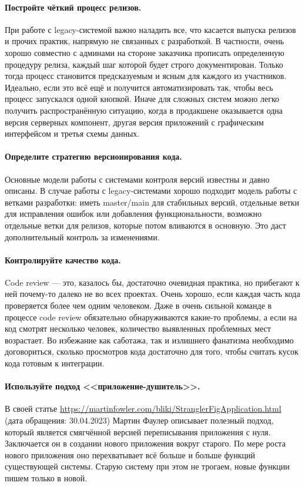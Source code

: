 \documentclass{../../text-style}
\begin{document}
\paragraph{Постройте чёткий процесс релизов.} При работе с legacy-системой важно наладить все, что касается выпуска релизов и прочих практик, напрямую не связанных с разработкой. В частности, очень хорошо совместно с админами на стороне заказчика прописать определенную процедуру релиза, каждый шаг которой будет строго документирован. Только тогда процесс становится предсказуемым и ясным для каждого из участников. Идеально, если это всё ещё и получится автоматизировать так, чтобы весь процесс запускался одной кнопкой. Иначе для сложных систем можно легко получить распространённую ситуацию, когда в продакшене оказывается одна версия серверных компонент, другая версия приложений с графическим интерфейсом и третья схемы данных.

\paragraph{Определите стратегию версионирования кода.} Основные модели работы с системами контроля версий известны и давно описаны. В случае работы с legacy-системами хорошо подходит модель работы с ветками разработки: иметь master/main для стабильных версий, отдельные ветки для исправления ошибок или добавления функциональности, возможно отдельные ветки для релизов, которые потом вливаются в основную. Это даст дополнительный контроль за изменениями.

\paragraph{Контролируйте качество кода.} Code review --- это, казалось бы, достаточно очевидная практика, но прибегают к ней почему-то далеко не во всех проектах. Очень хорошо, если каждая часть кода проверяется более чем одним человеком. Даже в очень сильной команде в процессе code review обязательно обнаруживаются какие-то проблемы, а если на код смотрят несколько человек, количество выявленных проблемных мест возрастает. Во избежание как саботажа, так и излишнего фанатизма необходимо договориться, сколько просмотров кода достаточно для того, чтобы считать кусок кода готовым к интеграции.

\paragraph{Используйте подход <<приложение-душитель>>.} В своей статье \url{https://martinfowler.com/bliki/StranglerFigApplication.html} (дата обращения: 30.04.2023) Мартин Фаулер описывает полезный подход, который является смягчённой версией переписывания приложения с нуля. Заключается он в создании нового приложения вокруг старого. По мере роста нового приложения оно перехватывает всё больше и больше функций существующей системы. Старую систему при этом не трогаем, новые функции пишем только в новой.
\end{document}
